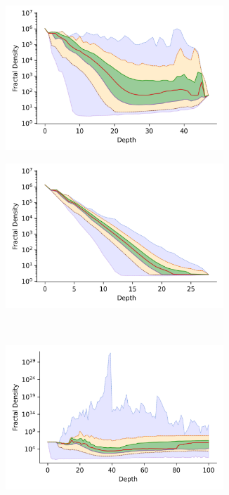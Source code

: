 \documentclass[review,supplement,onefignum,onetabnum]{siamonline220329}
\begin{document}
\begin{figure}
\begin{subfigure}[b]{0.47\textwidth}
        \includegraphics[width=0.9\textwidth]{images/fractal_density/sift.png}\\
        \label{fig:supplement:sift-fractal_density}
    \end{subfigure}%
    \begin{subfigure}[b]{0.47\textwidth}
        \includegraphics[width=0.9\textwidth]{images/fractal_density/random.png}\\
        \label{fig:supplement:random-fractal_density}
    \end{subfigure}
    \\
    \begin{subfigure}[b]{0.47\textwidth}
        \includegraphics[width=0.9\textwidth]{images/fractal_density/silva-SSU-Ref.png}\\

\end{subfigure}
\end{figure}
\end{document}
